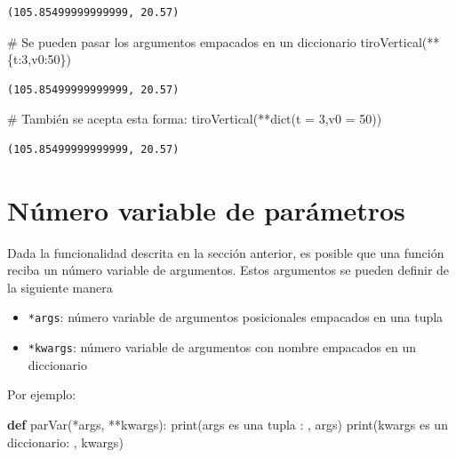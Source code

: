 \documentclass[
  spanish,
  letterpaper,
]{scrbook}
\newenvironment{Shaded}{\begin{snugshade}}{\end{snugshade}}
\newcommand{\BuiltInTok}[1]{\textcolor[rgb]{0.00,0.23,0.31}{#1}}
\newcommand{\CommentTok}[1]{\textcolor[rgb]{0.37,0.37,0.37}{#1}}
\newcommand{\DecValTok}[1]{\textcolor[rgb]{0.68,0.00,0.00}{#1}}
\newcommand{\KeywordTok}[1]{\textcolor[rgb]{0.00,0.23,0.31}{\textbf{#1}}}
\newcommand{\NormalTok}[1]{\textcolor[rgb]{0.00,0.23,0.31}{#1}}
\newcommand{\OperatorTok}[1]{\textcolor[rgb]{0.37,0.37,0.37}{#1}}
\newcommand{\StringTok}[1]{\textcolor[rgb]{0.13,0.47,0.30}{#1}}
\providecommand{\tightlist}{%
  \setlength{\itemsep}{0pt}\setlength{\parskip}{0pt}}
\theoremstyle{definition}
\theoremstyle{remark}
\begin{document}
\begin{verbatim}
(105.85499999999999, 20.57)
\end{verbatim}

\begin{Shaded}
\begin{Highlighting}[]
\CommentTok{\# Se pueden pasar los argumentos empacados en un diccionario}
\NormalTok{tiroVertical(}\OperatorTok{**}\NormalTok{\{}\StringTok{\textquotesingle{}t\textquotesingle{}}\NormalTok{:}\DecValTok{3}\NormalTok{,}\StringTok{\textquotesingle{}v0\textquotesingle{}}\NormalTok{:}\DecValTok{50}\NormalTok{\})}
\end{Highlighting}
\end{Shaded}

\begin{verbatim}
(105.85499999999999, 20.57)
\end{verbatim}

\begin{Shaded}
\begin{Highlighting}[]
\CommentTok{\# También se acepta esta forma:}
\NormalTok{tiroVertical(}\OperatorTok{**}\BuiltInTok{dict}\NormalTok{(t }\OperatorTok{=} \DecValTok{3}\NormalTok{,v0 }\OperatorTok{=} \DecValTok{50}\NormalTok{))}
\end{Highlighting}
\end{Shaded}

\begin{verbatim}
(105.85499999999999, 20.57)
\end{verbatim}

\section{Número variable de
parámetros}\label{nuxfamero-variable-de-paruxe1metros}

Dada la funcionalidad descrita en la sección anterior, es posible que
una función reciba un número variable de argumentos. Estos argumentos se
pueden definir de la siguiente manera

\begin{itemize}
\tightlist
\item
  \texttt{*args}: número variable de argumentos posicionales empacados
  en una tupla
\item
  \texttt{*kwargs}: número variable de argumentos con nombre empacados
  en un diccionario
\end{itemize}

Por ejemplo:

\begin{Shaded}
\begin{Highlighting}[]
\KeywordTok{def}\NormalTok{ parVar(}\OperatorTok{*}\NormalTok{args, }\OperatorTok{**}\NormalTok{kwargs):}
    \BuiltInTok{print}\NormalTok{(}\StringTok{\textquotesingle{}args es una tupla : \textquotesingle{}}\NormalTok{, args)}
    \BuiltInTok{print}\NormalTok{(}\StringTok{\textquotesingle{}kwargs es un diccionario: \textquotesingle{}}\NormalTok{, kwargs)}
\end{Highlighting}
\end{Shaded}
\end{document}
